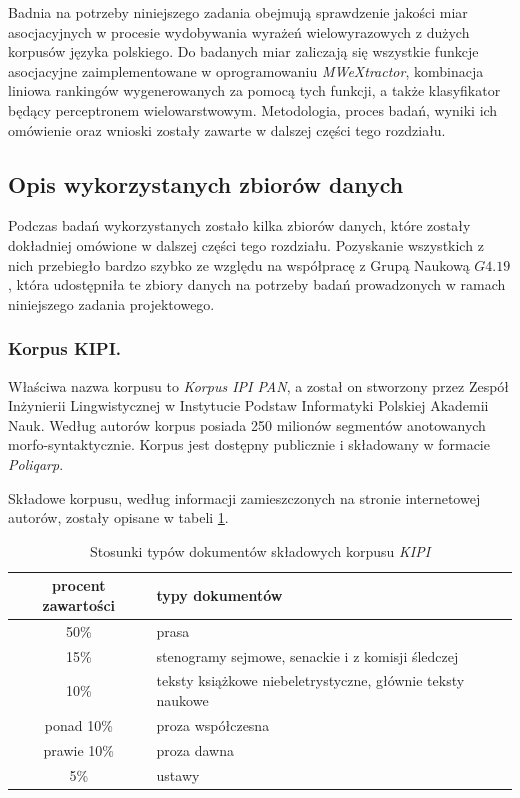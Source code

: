 \documentclass[11pt,a4paper]{llncs}
\begin{document}
Badnia na potrzeby niniejszego zadania obejmują sprawdzenie jakości miar asocjacyjnych w procesie wydobywania wyrażeń wielowyrazowych z dużych korpusów języka polskiego.
Do badanych miar zaliczają się wszystkie funkcje asocjacyjne zaimplementowane w oprogramowaniu \emph{MWeXtractor}, kombinacja liniowa rankingów wygenerowanych za pomocą tych funkcji, a także klasyfikator będący perceptronem wielowarstwowym.
Metodologia, proces badań, wyniki ich omówienie oraz wnioski zostały zawarte w dalszej części tego rozdziału.

\subsection{Opis wykorzystanych zbiorów danych}
Podczas badań wykorzystanych zostało kilka zbiorów danych, które zostały dokładniej omówione w dalszej części tego rozdziału.
Pozyskanie wszystkich z nich przebiegło bardzo szybko ze względu na współpracę z Grupą Naukową $G4.19$, która udostępniła te zbiory danych na potrzeby badań prowadzonych w ramach niniejszego zadania projektowego.

\subsubsection{Korpus KIPI.}

Właściwa nazwa korpusu to \emph{Korpus IPI PAN}, a został on stworzony przez Zespół Inżynierii Lingwistycznej w Instytucie Podstaw Informatyki Polskiej Akademii Nauk.
Według autorów korpus posiada 250 milionów segmentów anotowanych morfo-syntaktycznie.
Korpus jest dostępny publicznie i składowany w formacie \emph{Poliqarp}.

Składowe korpusu, według informacji zamieszczonych na stronie internetowej autorów, zostały opisane w tabeli \ref{kipi_stats}.

\begin{table}[h!]
\centering
\begin{tabular}{ c | l }
	\toprule
	procent zawartości & typy dokumentów \\
	\midrule
	50\% & prasa \\
	15\% & stenogramy sejmowe, senackie i z komisji śledczej \\
	10\% & teksty książkowe niebeletrystyczne, głównie teksty naukowe \\
	ponad 10\% & proza współczesna \\
	prawie 10\%  & proza dawna \\
	5\% & ustawy \\
	\bottomrule
\end{tabular}
\caption[Składowe korpus \emph{KIPI}]{Stosunki typów dokumentów składowych korpusu \emph{KIPI}}
\label{kipi_stats}
\end{table}
\end{document}
